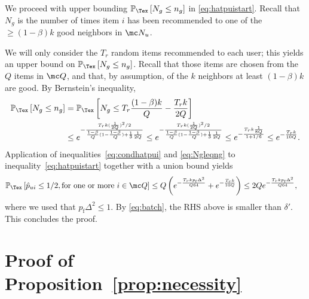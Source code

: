 \documentclass{article}
\newcommand\pf{p_{\mathrm{f}}}
\newcommand{\setQ}{\mc Q}
\renewcommand\PR[2][\Tex]{
\ifthenelse{\equal{#1}{}}{{\mathbb P}\left[#2\right]}{\ensuremath{{\mathbb P}_{#1}\left[ #2\right]}}}
\begin{document}
We proceed with upper bounding $\PR{N_g \leq n_g}$ in \eqref{eq:hatpuistart}. 
Recall that $N_g$ is the number of times item $i$ has been recommended to one of the $\geq (1-\beta) k$ good neighbors in $\mc N_u$. 

We will only consider the $T_r$ random items recommended to each user; this yields an upper bound on $\PR{N_g \leq n_g}$. 
Recall that those items are chosen from the $Q$ items in $\setQ$, and that, by assumption, of the $k$ neighbors at least $(1-\beta) k$ are good. 
By Bernstein's inequality, %
%
\begin{align}
\PR{N_g \leq n_g} 
%
&= 
\PR{N_g \leq T_r \frac{(1-\beta)k}{Q}  - 
\frac{T_r k}{2Q}
} \nonumber \\
%
&\leq 
e^{- \frac{T_r k ( \frac{1}{2Q} )^2/2}{
\frac{1-\beta}{Q}(1 - \frac{1-\beta}{Q} )
+ \frac{1}{3} \frac{1}{2Q}
} }
%
\leq 
e^{- \frac{T_r k ( \frac{1}{2Q} )^2/2}{
\frac{1-\beta}{Q}(1 - \frac{1-\beta}{Q} )
+ \frac{1}{3} \frac{1}{2Q}
} } 
%
\leq 
e^{- \frac{T_r k \frac{1}{8Q} }{
1 + 1/6
} } 
%
\leq e^{- \frac{T_r k}{10 Q} }. 
\label{eq:Ngleqng} 
\end{align}
Application of inequalities~\eqref{eq:condhatpui} and \eqref{eq:Ngleqng} to inequality~\eqref{eq:hatpuistart} together with a union bound yields 
\begin{align}
\PR{\hat p_{ui} \leq 1/2, \text{for one or more } i \in \setQ}
%
&\leq 
Q \left(  e^{ -  \frac{  T_r k  \pf  \Delta^2 }{ Q 64  } }  + e^{-   \frac{T_r k}{10 Q} }  \right) 
\leq 
2 Q e^{ -  \frac{  T_r k  \pf  \Delta^2 }{ Q 64  } },
\end{align}
where we used that $\pf \Delta^2 \leq 1$. 
By \eqref{eq:batch}, the RHS above is smaller than $\delta'$. This concludes the proof. 

\section{Proof of Proposition~\ref{prop:necessity}}
\end{document}
